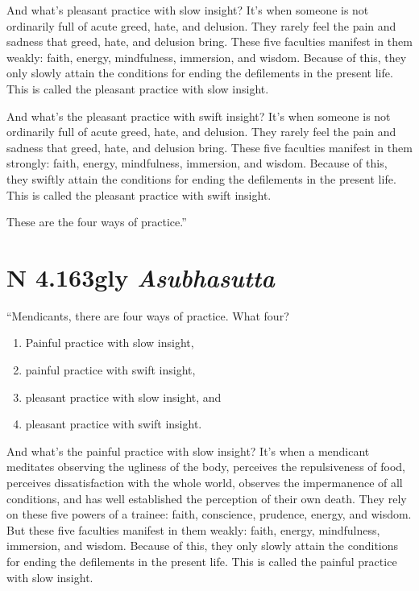 \documentclass[12pt,openany]{book}%
\newcommand*{\suttatitleacronym}[1]{\smaller[2]{#1}\vspace*{.3em}}
\newcommand*{\suttatitletranslation}[1]{\linebreak{#1}}
\newcommand*{\suttatitleroot}[1]{\linebreak\smaller[2]\itshape{#1}}
\newcommand*{\tocacronym}[1]{\hspace*{-3.3em}{#1}\quad}
\newcommand*{\toctranslation}[1]{#1}
\newcommand*{\tocroot}[1]{(\textit{#1})}
\begin{document}
And what’s pleasant practice with slow insight? It’s when someone is not ordinarily full of acute greed, hate, and delusion. They rarely feel the pain and sadness that greed, hate, and delusion bring. These five faculties manifest in them weakly: faith, energy, mindfulness, immersion, and wisdom. Because of this, they only slowly attain the conditions for ending the defilements in the present life. This is called the pleasant practice with slow insight. 

And what’s the pleasant practice with swift insight? It’s when someone is not ordinarily full of acute greed, hate, and delusion. They rarely feel the pain and sadness that greed, hate, and delusion bring. These five faculties manifest in them strongly: faith, energy, mindfulness, immersion, and wisdom. Because of this, they swiftly attain the conditions for ending the defilements in the present life. This is called the pleasant practice with swift insight. 

These are the four ways of practice.” 

%
\section*{{\suttatitleacronym AN 4.163}{\suttatitletranslation Ugly }{\suttatitleroot Asubhasutta}}
\addcontentsline{toc}{section}{\tocacronym{AN 4.163} \toctranslation{Ugly } \tocroot{Asubhasutta}}

“Mendicants, there are four ways of practice. What four? 

\begin{enumerate}%
\item Painful practice with slow insight, %
\item painful practice with swift insight, %
\item pleasant practice with slow insight, and %
\item pleasant practice with swift insight. %
\end{enumerate}

And what’s the painful practice with slow insight? It’s when a mendicant meditates observing the ugliness of the body, perceives the repulsiveness of food, perceives dissatisfaction with the whole world, observes the impermanence of all conditions, and has well established the perception of their own death. They rely on these five powers of a trainee: faith, conscience, prudence, energy, and wisdom. But these five faculties manifest in them weakly: faith, energy, mindfulness, immersion, and wisdom. Because of this, they only slowly attain the conditions for ending the defilements in the present life. This is called the painful practice with slow insight. 
\end{document}
